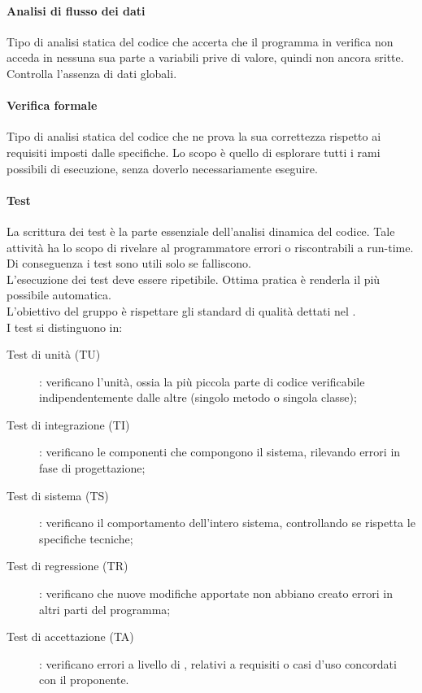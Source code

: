 \paragraph{Analisi di flusso dei dati} 
Tipo di analisi statica del codice che accerta che il programma in verifica non acceda in nessuna sua parte a variabili prive di valore, quindi non ancora sritte. Controlla l'assenza di dati globali.

\paragraph{Verifica formale} 
Tipo di analisi statica del codice che ne prova la sua correttezza rispetto ai requisiti imposti dalle specifiche. Lo scopo è quello di esplorare tutti i rami possibili di esecuzione, senza doverlo necessariamente eseguire. 

\paragraph{Test} 
La scrittura dei test è la parte essenziale dell'analisi dinamica del codice. Tale attività ha lo scopo di rivelare al programmatore errori o  riscontrabili a run-time. Di conseguenza i test sono utili solo se falliscono. \\
L'esecuzione dei test deve essere ripetibile. Ottima pratica è renderla il più possibile automatica. \\
L'obiettivo del gruppo è rispettare gli standard di qualità dettati nel \PdQv. \\
I test si distinguono in:
\begin{description}
	\item[Test di unità (TU)] : verificano l'unità, ossia la più piccola parte di codice verificabile indipendentemente dalle altre (singolo metodo o singola classe);
	\item[Test di integrazione (TI)] : verificano le componenti che compongono il sistema, rilevando errori in fase di progettazione;
	\item[Test di sistema (TS)] : verificano il comportamento dell'intero sistema, controllando se rispetta le specifiche tecniche;
	\item[Test di regressione (TR)] : verificano che nuove modifiche apportate non abbiano creato errori in altri parti del programma;
	\item[Test di accettazione (TA)] : verificano errori a livello di , relativi a requisiti o casi d'uso concordati con il proponente.
\end{description}

